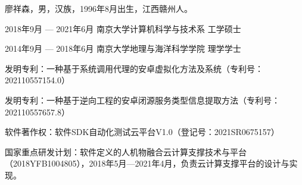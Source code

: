 \documentclass[winfonts,master,twoside]{njuthesis}
\begin{document}
\begin{resume}
\begin{authorinfo}
\noindent 廖祥森，男，汉族，1996年8月出生，江西赣州人。
\end{authorinfo}
\begin{education}
\item[2018年9月 --- 2021年6月] 南京大学计算机科学与技术系 \hfill 工学硕士
\item[2014年9月 --- 2018年6月] 南京大学地理与海洋科学学院 \hfill 理学学士
\end{education}
\begin{publications}
\item 发明专利：一种基于系统调用代理的安卓虚拟化方法及系统（专利号：202110557154.0）
\item 发明专利：一种基于逆向工程的安卓闭源服务类型信息提取方法（专利号：202110557657.8）
\item 软件著作权：软件SDK自动化测试云平台V1.0（登记号：2021SR0675157）
\end{publications}
\begin{projects}
\item 国家重点研发计划：软件定义的人机物融合云计算支撑技术与平台（2018YFB1004805），2018年5月—2021年4月，负责云计算支撑平台的设计与实现。
\end{projects}
\end{resume}

\makelicense

\end{document}
